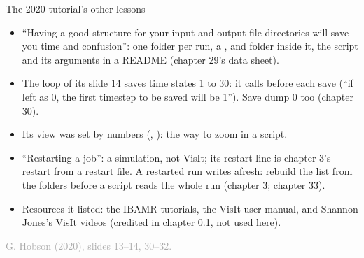 \documentclass[aspectratio=169,11pt]{beamer}
\newcommand{\sourcecredit}[1]{\vfill\begin{flushright}\tiny\textcolor{DarkGray}{#1}\end{flushright}}
\begin{document}
\begin{frame}{The 2020 tutorial's other lessons}
\label{fr:lessons}
\footnotesize
\begin{itemize}\setlength{\itemsep}{1pt}
  \item ``Having a good structure for your input and output file directories will save you time and confusion'': one folder per run, a ,  and  folder inside it, the script and its arguments in a README (chapter 29's data sheet).
  \item The loop of its slide 14 saves time states 1 to 30: it calls  before each save (``if left as 0, the first timestep to be saved will be 1''). Save dump 0 too (chapter 30).
  \item Its view was set by numbers (, ): the way to zoom in a script.
  \item ``Restarting a job'': a simulation, not VisIt; its restart line  is chapter 3's restart from a restart file. A restarted run writes  afresh: rebuild the list from the  folders before a script reads the whole run (chapter 3; chapter 33).
  \item Resources it listed: the IBAMR tutorials, the VisIt user manual, and Shannon Jones's VisIt videos (credited in chapter 0.1, not used here).
\end{itemize}
\sourcecredit{G. Hobson (2020), slides 13--14, 30--32.}
\end{frame}
\end{document}
